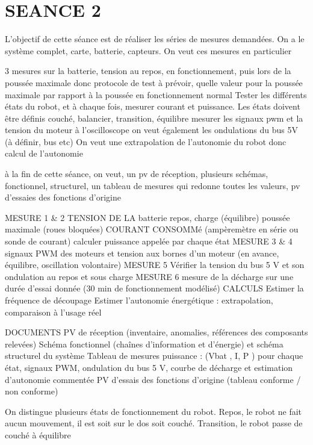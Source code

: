 \section{SEANCE 2}
L'objectif de cette séance est de réaliser les séries de mesures demandées.
On a le système complet, carte, batterie, capteurs.
On veut ces mesures en particulier

3 mesures sur la batterie, tension au repos, en fonctionnement, 
puis lors de la poussée maximale
donc protocole de test à prévoir, quelle valeur pour la poussée maximale
par rapport à la poussée en fonctionnement normal
Tester les différents états du robot, et à chaque fois, 
mesurer courant et puissance. Les états doivent être définis
couché, balancier, transition, équilibre
mesurer les signaux pwm et la tension du moteur à l'oscilloscope
on veut également les ondulations du bus 5V (à définir, bus etc)
On veut une extrapolation de l'autonomie du robot
donc calcul de l'autonomie

à la fin de cette séance, on veut, un pv de réception, plusieurs schémas,
fonctionnel, structurel, un tableau de mesures qui redonne toutes les valeurs,
pv d'essaies des fonctions d'origine

MESURE 1 & 2
TENSION DE LA batterie
repos, charge (équilibre) poussée maximale (roues bloquées)
COURANT CONSOMMé (ampèremètre en série ou sonde de courant)
calculer puissance appelée par chaque état
MESURE 3 & 4
signaux PWM des moteurs et tension aux bornes d'un moteur
(en avance, équilibre, oscillation volontaire)
MESURE 5
Vérifier la tension du bus 5 V et son ondulation au repos et sous charge
MESURE 6
mesure de la décharge sur une durée d’essai donnée (30
min de fonctionnement modélisé)
CALCULS
Estimer la fréquence de découpage
Estimer l’autonomie énergétique : extrapolation, comparaison à l’usage réel

DOCUMENTS
PV de réception (inventaire, anomalies, références des composants relevées)
Schéma fonctionnel 
(chaînes d’information et d’énergie) et schéma structurel du système
Tableau de mesures puissance : (Vbat , I, P ) pour chaque état, signaux PWM, 
ondulation du bus 5 V, courbe de décharge et estimation d’autonomie commentée
PV d’essais des fonctions d’origine (tableau conforme / non conforme)

On distingue plusieurs états de fonctionnement du robot.
Repos, le robot ne fait aucun mouvement, il est soit sur le dos soit couché.
Transition, le robot passe de couché à équilibre

